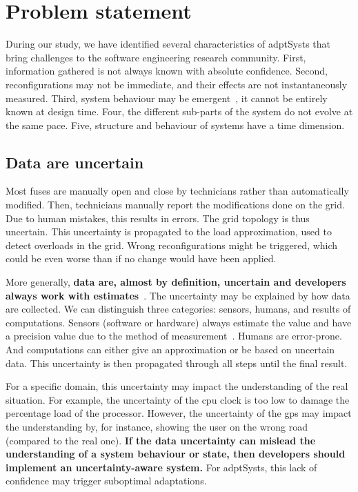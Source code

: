 \section{Problem statement}

During our study, we have identified several characteristics of \glspl{adptSyst} that bring challenges to the software engineering research community.
First, information gathered is not always known with absolute confidence.
Second, reconfigurations may not be immediate, and their effects are not instantaneously measured.
Third, system behaviour may be emergent~\cite{zio2011uncertainties}, \ie it cannot be entirely known at design time.
Four, the different sub-parts of the system do not evolve at the same pace.
Five, structure and behaviour of systems have a time dimension.


\subsection{Data are uncertain}
Most fuses are manually open and close by technicians rather than automatically modified.
Then, technicians manually report the modifications done on the grid.
Due to human mistakes, this results in errors.
The grid topology is thus uncertain.
This uncertainty is propagated to the load approximation, used to detect overloads in the grid.
Wrong reconfigurations might be triggered, which could be even worse than if no change would have been applied.

More generally, \textbf{data are, almost by definition, uncertain and developers always work with estimates}~\cite{DBLP:conf/asplos/BornholtMM14, metrology2008evaluation, DBLP:journals/tkde/AggarwalY09}.
The uncertainty may be explained by how data are collected.
We can distinguish three categories: sensors, humans, and results of computations.
Sensors (software or hardware) always estimate the value and have a precision value due to the method of measurement~\cite{metrology2008evaluation, DBLP:conf/asplos/BornholtMM14}.
Humans are error-prone.
And computations can either give an approximation or be based on uncertain data.
This uncertainty is then propagated through all steps until the final result.

For a specific domain, this uncertainty may impact the understanding of the real situation.
For example, the uncertainty of the \gls{cpu} clock is too low to damage the percentage load of the processor.
However, the uncertainty of the \gls{gps} may impact the understanding by, for instance, showing the user on the wrong road (compared to the real one).
\textbf{If the data uncertainty can mislead the understanding of a system behaviour or state, then developers should implement an uncertainty-aware system.}
For \glspl{adptSyst}, this lack of confidence may trigger suboptimal adaptations.



